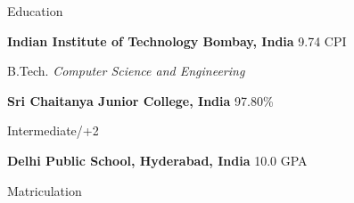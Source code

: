 \begin{rubric}{Education}

\entry*[2019 -- 2021*]%
	\textbf{Indian Institute of Technology Bombay, India} \hfill 9.74 CPI
	\par B.Tech. \emph{Computer Science and Engineering}


\entry*[2017 -- 2019]%
	\textbf{Sri Chaitanya Junior College, India} \hfill 97.80\% \par
	Intermediate/+2
	

\entry*[2010 -- 2017]%
	\textbf{Delhi Public School, Hyderabad, India} \hfill 10.0 GPA \par
	Matriculation
\end{rubric}